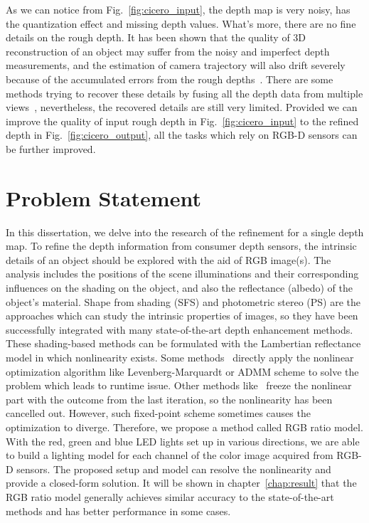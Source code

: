 As we can notice from Fig.~\ref{fig:cicero_input}, the depth map is very noisy, has the quantization effect and missing depth values.
What's more, there are no fine details on the rough depth.
It has been shown that the quality of 3D reconstruction of an object may suffer from the noisy and imperfect depth measurements, and the estimation of camera trajectory will also drift severely because of the accumulated errors from the rough depths~\cite{maier2013thesis}.
There are some methods trying to recover these details by fusing all the depth data from multiple views~\cite{newcombe2011kinectfusion}, nevertheless, the recovered details are still very limited.
Provided we can improve the quality of input rough depth in Fig.~\ref{fig:cicero_input} to the refined depth in Fig.~\ref{fig:cicero_output}, all the tasks which rely on RGB-D sensors can be further improved. 

\section{Problem Statement}

In this dissertation, we delve into the research of the refinement for a single depth map.
To refine the depth information from consumer depth sensors, the intrinsic details of an object should be explored with the aid of RGB image(s).
The analysis includes the positions of the scene illuminations and their corresponding influences on the shading on the object, and also the reflectance (albedo) of the object's material.
Shape from shading (SFS) and photometric stereo (PS) are the approaches which can study the intrinsic properties of images, so they have been successfully integrated with many state-of-the-art depth enhancement methods.
These shading-based methods can be formulated with the Lambertian reflectance model in which nonlinearity exists. 
Some methods~\cite{wu2014real, or2016real} directly apply the nonlinear optimization algorithm like Levenberg-Marquardt or ADMM scheme to solve the problem which leads to runtime issue. 
Other methods like~\cite{or2015rgbd} freeze the nonlinear part with the outcome from the last iteration, so the nonlinearity has been cancelled out.
However, such fixed-point scheme sometimes causes the optimization to diverge.
Therefore, we propose a method called RGB ratio model.
With the red, green and blue LED lights set up in various directions, we are able to build a lighting model for each channel of the color image acquired from RGB-D sensors.
The proposed setup and model can resolve the nonlinearity and provide a closed-form solution. 
It will be shown in chapter~\ref{chap:result} that the RGB ratio model generally achieves similar accuracy to the state-of-the-art methods and has better performance in some cases.


